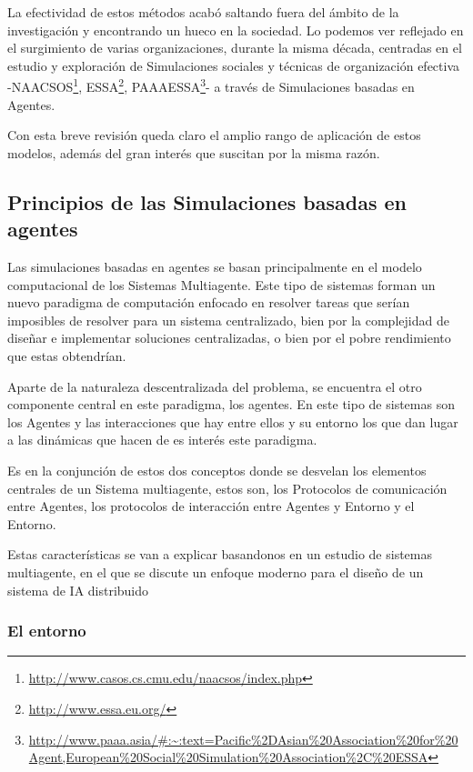 La efectividad de estos métodos acabó saltando fuera del ámbito de la investigación y encontrando un hueco en la sociedad. Lo podemos ver reflejado en el surgimiento de varias organizaciones, durante la misma década, centradas en el estudio y exploración de Simulaciones sociales y técnicas de organización efectiva -NAACSOS\footnote{\url{http://www.casos.cs.cmu.edu/naacsos/index.php}}, ESSA\footnote{\url{http://www.essa.eu.org/}}, PAAAESSA\footnote{\url{http://www.paaa.asia/\#:~:text=Pacific\%2DAsian\%20Association\%20for\%20Agent,European\%20Social\%20Simulation\%20Association\%2C\%20ESSA}}- a través de Simulaciones basadas en Agentes.

Con esta breve revisión queda claro el amplio rango de aplicación de estos modelos, además del gran interés que suscitan por la misma razón.

\subsection{Principios de las Simulaciones basadas en agentes}

Las simulaciones basadas en agentes se basan principalmente en el modelo computacional de los Sistemas Multiagente. Este tipo de sistemas forman un nuevo paradigma de computación enfocado en resolver tareas que serían imposibles de resolver para un sistema centralizado, bien por la complejidad de diseñar e implementar soluciones centralizadas, o bien por el pobre rendimiento que estas obtendrían.

Aparte de la naturaleza descentralizada del problema, se encuentra el otro componente central en este paradigma, los agentes. En este tipo de sistemas son los Agentes y las interacciones que hay entre ellos y su entorno los que dan lugar a las dinámicas que hacen de es interés este paradigma.

Es en la conjunción de estos dos conceptos donde se desvelan los elementos centrales de un Sistema multiagente, estos son, los Protocolos de comunicación entre Agentes, los protocolos de interacción entre Agentes y Entorno y el Entorno.

Estas características se van a explicar basandonos en un estudio de sistemas multiagente, en el que se discute un enfoque moderno para el diseño de un sistema de IA distribuido \citep{weiss1999multiagent}

\subsubsection{El entorno}

